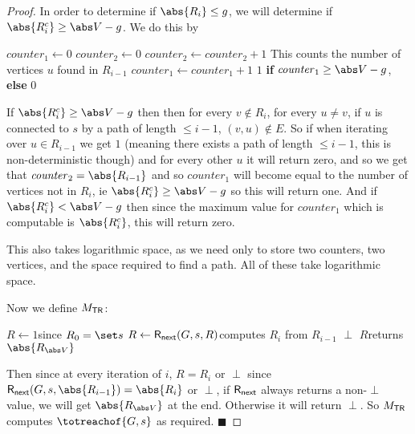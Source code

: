 \documentclass[10pt]{article}
\def\qed{%
    \ifmmode%
        \eqno\blacksquare%
    \else%
        \hskip1cm\allowbreak\hbox{}\nobreak\hfill$\blacksquare$%
    \fi%
}
\begin{document}
\begin{proof}
    In order to determine if $\abs{R_i}\leq g$, we will determine if $\abs{R_i^c}\geq\abs V-g$.
    We do this by

    \def\ctr{\mathit{counter}}
    \algorithm
        \State $\ctr_1\gets0$
            \State $\ctr_2\gets0$
                 $\ctr_2\gets\ctr_2+1$
                \Comment This counts the number of vertices $u$ found in $R_{i-1}$ \EndComment
            \EndFor
            \lIf{$\ctr_2=\abs{R_{i-1}}$} $\ctr_1\gets\ctr_1+1$
        \EndFor
        \State\Return $1$ \textbf{if} $\ctr_1\geq\abs V-g$, \textbf{else} $0$
    \ealgorithm

    If $\abs{R_i^c}\geq\abs V-g$ then then for every $v\notin R_i$, for every $u\neq v$, if $u$ is connected to $s$ by a path of length $\leq i-1$, $(v,u)\notin E$.
    So if when iterating over $u\in R_{i-1}$ we get $1$ (meaning there exists a path of length $\leq i-1$, this is non-deterministic though) and for every other $u$ it will return zero, and so we get that
    $\ctr_2=\abs{R_{i-1}}$ and so $\ctr_1$ will become equal to the number of vertices not in $R_i$, ie $\abs{R_i^c}\geq\abs V-g$ so this will return one.
    And if $\abs{R_i^c}<\abs V-g$ then since the maximum value for $\ctr_1$ which is computable is $\abs{R_i^c}$, this will return zero.

    This also takes logarithmic space, as we need only to store two counters, two vertices, and the space required to find a path.
    All of these take logarithmic space.

    Now we define $M_{\mathsf{TR}}$:

    \algorithm
            \State $R\gets1$\lComment since $R_0=\set s$
                \State $R\leftarrow\mathsf{R_{next}}(G,s,R)$\lComment computes $R_i$ from $R_{i-1}$
                 \Return $\perp$
            \EndFor
            \State\Return $R$\lComment returns $\abs{R_{\abs V}}$
        \EndFunc
    \ealgorithm

    Then since at every iteration of $i$, $R=R_i$ or $\perp$ since $\Rnext(G,s,\abs{R_{i-1}})=\abs{R_i}$ or $\perp$, if $\mathsf{R_{next}}$ always returns a non-$\perp$ value, we will get $\abs{R_{\abs V}}$ at the end.
    Otherwise it will return $\perp$.
    So $M_{\mathsf{TR}}$ computes $\totreachof{G,s}$ as required.
    \qed

\end{proof}
\end{document}
